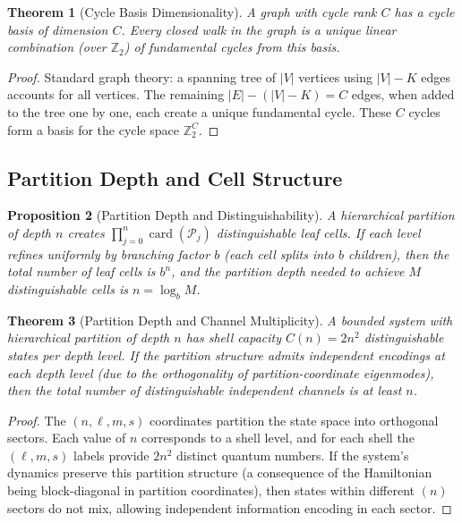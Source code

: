 \documentclass[11pt,twocolumn,a4paper]{article}
\newtheorem{theorem}{Theorem}[section]
\newtheorem{proposition}[theorem]{Proposition}
\theoremstyle{definition}
\DeclareMathOperator{\card}{card}
\newcommand{\calP}{\mathcal{P}}
\begin{document}
\begin{theorem}[Cycle Basis Dimensionality]
\label{thm:cycle-basis}
A graph with cycle rank $C$ has a cycle basis of dimension $C$. Every closed walk in the graph is a unique linear combination (over $\mathbb{Z}_2$) of fundamental cycles from this basis.
\end{theorem}

\begin{proof}
Standard graph theory: a spanning tree of $|V|$ vertices using $|V|-K$ edges accounts for all vertices. The remaining $|E| - (|V| - K) = C$ edges, when added to the tree one by one, each create a unique fundamental cycle. These $C$ cycles form a basis for the cycle space $\mathbb{Z}_2^C$.
\end{proof}

\subsection{Partition Depth and Cell Structure}

\begin{proposition}[Partition Depth and Distinguishability]
\label{prop:partition-depth}
A hierarchical partition of depth $n$ creates $\prod_{j=0}^n \card(\calP_j)$ distinguishable leaf cells. If each level refines uniformly by branching factor $b$ (each cell splits into $b$ children), then the total number of leaf cells is $b^n$, and the partition depth needed to achieve $M$ distinguishable cells is $n = \log_b M$.
\end{proposition}

\begin{theorem}[Partition Depth and Channel Multiplicity]
\label{thm:partition-channel-mult}
A bounded system with hierarchical partition of depth $n$ has shell capacity $C(n) = 2n^2$ distinguishable states per depth level. If the partition structure admits independent encodings at each depth level (due to the orthogonality of partition-coordinate eigenmodes), then the total number of distinguishable independent channels is at least $n$.
\end{theorem}

\begin{proof}
The $(n,\ell,m,s)$ coordinates partition the state space into orthogonal sectors. Each value of $n$ corresponds to a shell level, and for each shell the $(\ell,m,s)$ labels provide $2n^2$ distinct quantum numbers. If the system's dynamics preserve this partition structure (a consequence of the Hamiltonian being block-diagonal in partition coordinates), then states within different $(n)$ sectors do not mix, allowing independent information encoding in each sector.
\end{proof}
\end{document}
